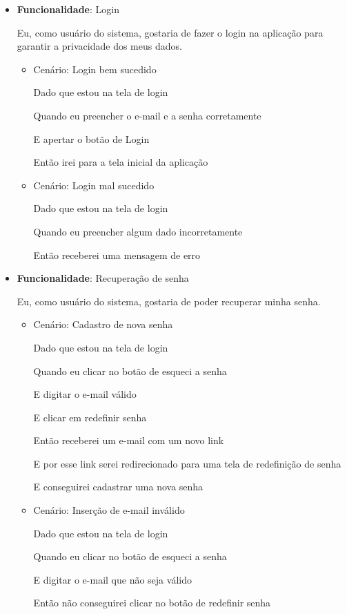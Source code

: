 \documentclass[
    12pt,               %
    openright,          %
    oneside,
    a4paper,            %
    english,            %
    brazil              %
    ]{ifsp-spo-inf-ctds} %
\begin{document}
\begin{itemize}
\item\textbf{Funcionalidade}: Login
    
    Eu, como usuário do sistema, gostaria de fazer o login na aplicação para garantir a privacidade dos meus dados.
    \begin{itemize}
        \item Cenário: Login bem sucedido  
        \par Dado que estou na tela de login
        \par Quando eu preencher o e-mail e a senha corretamente
        \par E apertar o botão de Login
        \par Então irei para a tela inicial da aplicação
    \end{itemize}   
    \begin{itemize}
        \item Cenário: Login mal sucedido  
        \par Dado que estou na tela de login
        \par Quando eu preencher algum dado incorretamente
        \par Então receberei uma mensagem de erro
    \end{itemize}    

\item\textbf{Funcionalidade}: Recuperação de senha
    
    Eu, como usuário do sistema, gostaria de poder recuperar minha senha.
    \begin{itemize}
        \item Cenário: Cadastro de nova senha
        \par Dado que estou na tela de login
        \par Quando eu clicar no botão de esqueci a senha
        \par E digitar o e-mail válido
        \par E clicar em redefinir senha
        \par Então receberei um e-mail com um novo link 
        \par E por esse link serei redirecionado para uma tela de redefinição de senha
        \par E conseguirei cadastrar uma nova senha
    \end{itemize}    
    \begin{itemize}
        \item Cenário: Inserção de e-mail inválido
        \par Dado que estou na tela de login
        \par Quando eu clicar no botão de esqueci a senha
        \par E digitar o e-mail que não seja válido
        \par Então não conseguirei clicar no botão de redefinir senha
    \end{itemize}    


\end{itemize}
\end{document}
